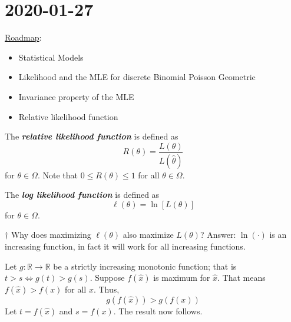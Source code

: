 \section{2020-01-27}
\underline{Roadmap}:
\begin{itemize}
    \item Statistical Models
    \item Likelihood and the MLE for discrete
          \subitem Binomial
          \subitem Poisson
          \subitem Geometric
    \item Invariance property of the MLE
    \item Relative likelihood function
\end{itemize}
\begin{defbox}
    \begin{definition}
        The \textbf{\emph{relative likelihood function}} is defined as
        \[ R(\theta)=\frac{L(\theta)}{L(\hat{\theta})} \]
        for $ \theta\in\Omega $. Note that $ 0\leqslant R(\theta)\leqslant 1 $
        for all $ \theta\in\Omega $.
    \end{definition}
\end{defbox}
\begin{defbox}
    \begin{definition}
        The \textbf{\emph{log likelihood function}} is defined as
        \[ \ell(\theta)=\ln\left[ L(\theta) \right] \]
        for $ \theta\in\Omega $.
    \end{definition}
\end{defbox}
$ \dagger $ Why does maximizing $ \ell(\theta) $ also maximize $ L(\theta) $?
Answer: $ \ln(\cdot) $ is an increasing function, in fact it will work for all increasing functions.

Let $ g:\mathbb{R}\to\mathbb{R} $ be a strictly increasing monotonic function;
that is $ t>s \iff g(t)>g(s) $. Suppose $ f(\hat{x}) $ is maximum for $ \hat{x} $.
That means $ f(\hat{x})>f(x) $ for all $ x $. Thus,
\[ g(f(\hat{x}))>g(f(x)) \]
Let $ t=f(\hat{x}) $ and $ s=f(x) $. The result now follows.

